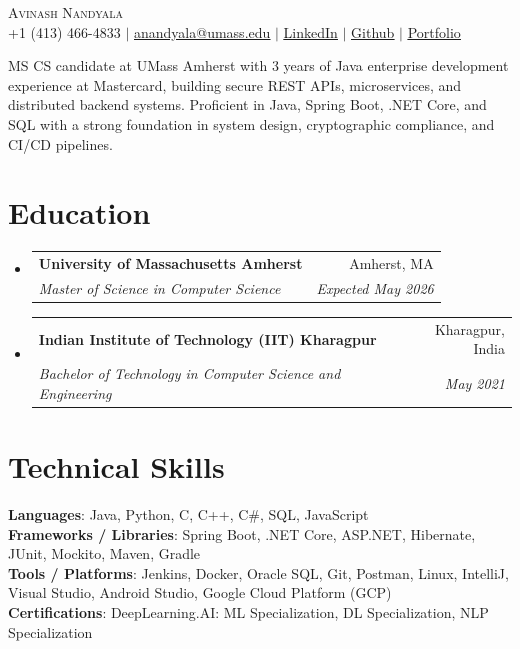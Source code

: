 \documentclass[letterpaper,11pt]{article}
\makeatletter
\newcommand{\resumeSubheading}[4]{
  \vspace{-2pt}\item
    \begin{tabular*}{0.97\textwidth}[t]{l@{\extracolsep{\fill}}r}
      \textbf{#1} & #2 \\
      \textit{\small#3} & \textit{\small #4} \\
    \end{tabular*}\vspace{-7pt}
}
\newcommand{\resumeSubHeadingListStart}{\begin{itemize}[leftmargin=0.15in, label={}]}
\newcommand{\resumeSubHeadingListEnd}{\end{itemize}}
\makeatother
\begin{document}

\begin{center}
  {\Huge\textsc{Avinash Nandyala}} \\ \vspace{1pt}
  \small +1 (413) 466-4833 $|$ \href{mailto:anandyala@umass.edu}{\underline{anandyala@umass.edu}} $|$
  \href{https://www.linkedin.com/in/avinash-nandyala-06a88b199/}{\underline{LinkedIn}} $|$
  \href{https://github.com/navinash47}{\underline{Github}} $|$
  \href{https://navinash47.github.io/Portfolio/}{\underline{Portfolio}}
\end{center}

\begin{center}
  \small{MS CS candidate at UMass Amherst with 3 years of Java enterprise development experience at Mastercard, building secure REST APIs, microservices, and distributed backend systems. Proficient in Java, Spring Boot, .NET Core, and SQL with a strong foundation in system design, cryptographic compliance, and CI/CD pipelines.}
\end{center}

\section{Education}
\resumeSubHeadingListStart
  \resumeSubheading
    {University of Massachusetts Amherst}{Amherst, MA}
    {Master of Science in Computer Science}{Expected May 2026}
  \resumeSubheading
    {Indian Institute of Technology (IIT) Kharagpur}{Kharagpur, India}
    {Bachelor of Technology in Computer Science and Engineering}{May 2021}
\resumeSubHeadingListEnd


\section{Technical Skills}
\begin{itemize}[leftmargin=0.15in, label={}]
  \small{\item{
    \textbf{Languages}{: Java, Python, C, C++, C\#, SQL, JavaScript} \\
    \textbf{Frameworks / Libraries}{: Spring Boot, .NET Core, ASP.NET, Hibernate, JUnit, Mockito, Maven, Gradle} \\
    \textbf{Tools / Platforms}{: Jenkins, Docker, Oracle SQL, Git, Postman, Linux, IntelliJ, Visual Studio, Android Studio, Google Cloud Platform (GCP)} \\
    \textbf{Certifications}{: DeepLearning.AI: ML Specialization, DL Specialization, NLP Specialization}
  }}
\end{itemize}
\end{document}
